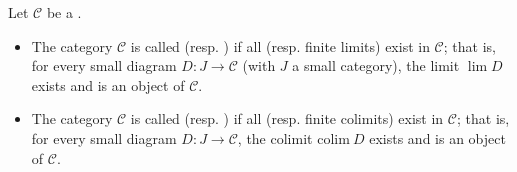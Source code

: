 \begin{definition} \label{definition:complete_and_cocomplete_category}
Let $\mathcal{C}$ be a .  
\begin{itemize}
    \item The category $\mathcal{C}$ is called  (resp. ) if all  (resp. finite limits) exist in $\mathcal{C}$; that is, for every small diagram $D : J \to \mathcal{C}$ (with $J$ a small category), the limit $\lim D$ exists and is an object of $\mathcal{C}$.
    \item The category $\mathcal{C}$ is called  (resp. ) if all  (resp. finite colimits) exist in $\mathcal{C}$; that is, for every small diagram $D : J \to \mathcal{C}$, the colimit $\mathrm{colim}\ D$ exists and is an object of $\mathcal{C}$.
\end{itemize}
\end{definition}
